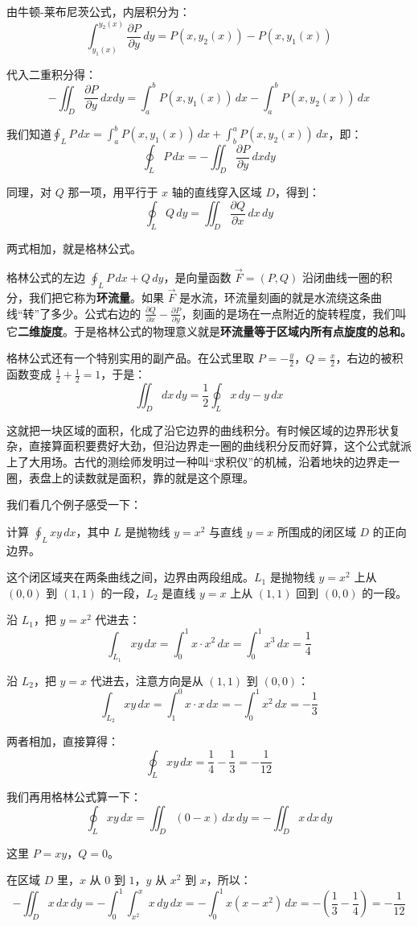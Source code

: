 由牛顿-莱布尼茨公式，内层积分为：
\[
\int_{y_1(x)}^{y_2(x)} \frac{\partial P}{\partial y}\,dy
= P(x,y_2(x)) - P(x,y_1(x))
\]

代入二重积分得：
\[-\iint_D \frac{\partial P}{\partial y}\,dxdy
= \int_a^b P(x,y_1(x))\,dx - \int_a^b P(x,y_2(x))\,dx\]

我们知道\(\oint_L P\,dx = \int_a^b P(x,y_1(x))\,dx + \int_b^a P(x,y_2(x))\,dx\)，即：
\[
\oint_L P\,dx = -\iint_D \frac{\partial P}{\partial y}\,dxdy
\]

同理，对 \(Q\) 那一项，用平行于 \(x\) 轴的直线穿入区域 \(D\)，得到：
\[
\oint_L Q\,dy = \iint_D \frac{\partial Q}{\partial x}\,dx\,dy
\]

两式相加，就是格林公式。

格林公式的左边 \(\oint_L P\,dx+Q\,dy\)，是向量函数 \(\vec{F}=(P,Q)\) 沿闭曲线一圈的积分，我们把它称为\textbf{环流量}。如果 \(\vec{F}\) 是水流，环流量刻画的就是水流绕这条曲线“转”了多少。公式右边的 \(\frac{\partial Q}{\partial x}-\frac{\partial P}{\partial y}\)，刻画的是场在一点附近的旋转程度，我们叫它\textbf{二维旋度}。于是格林公式的物理意义就是\textbf{环流量等于区域内所有点旋度的总和。}

格林公式还有一个特别实用的副产品。在公式里取 \(P=-\frac{y}{2}\)，\(Q=\frac{x}{2}\)，右边的被积函数变成 \(\frac12+\frac12=1\)，于是：
\[
\iint_D dx\,dy = \frac12 \oint_L x\,dy - y\,dx
\]

这就把一块区域的面积，化成了沿它边界的曲线积分。有时候区域的边界形状复杂，直接算面积要费好大劲，但沿边界走一圈的曲线积分反而好算，这个公式就派上了大用场。古代的测绘师发明过一种叫“求积仪”的机械，沿着地块的边界走一圈，表盘上的读数就是面积，靠的就是这个原理。

我们看几个例子感受一下：

\begin{myexample}
    计算 \(\oint_L xy\,dx\)，其中 \(L\) 是抛物线 \(y=x^2\) 与直线 \(y=x\) 所围成的闭区域 \(D\) 的正向边界。

    这个闭区域夹在两条曲线之间，边界由两段组成。\(L_1\) 是抛物线 \(y=x^2\) 上从 \((0,0)\) 到 \((1,1)\) 的一段，\(L_2\) 是直线 \(y=x\) 上从 \((1,1)\) 回到 \((0,0)\) 的一段。

    沿 \(L_1\)，把 \(y=x^2\) 代进去：
    \[
    \int_{L_1} xy\,dx = \int_0^1 x\cdot x^2\,dx = \int_0^1 x^3\,dx = \frac14
    \]

    沿 \(L_2\)，把 \(y=x\) 代进去，注意方向是从 \((1,1)\) 到 \((0,0)\)：
    \[
    \int_{L_2} xy\,dx = \int_1^0 x\cdot x\,dx = -\int_0^1 x^2\,dx = -\frac13
    \]

    两者相加，直接算得：
    \[
    \oint_L xy\,dx = \frac14 - \frac13 = -\frac{1}{12}
    \]

    我们再用格林公式算一下：
    \[
    \oint_L xy\,dx = \iint_D (0-x)\,dx\,dy = -\iint_D x\,dx\,dy
    \]
    
    这里 \(P=xy\)，\(Q=0\)。

    在区域 \(D\) 里，\(x\) 从 \(0\) 到 \(1\)，\(y\) 从 \(x^2\) 到 \(x\)，所以：
    \[
    -\iint_D x\,dx\,dy = -\int_0^1\int_{x^2}^{x} x\,dy\,dx = -\int_0^1 x(x-x^2)\,dx = -\left(\frac13-\frac14\right) = -\frac1{12}
    \]
\end{myexample}

